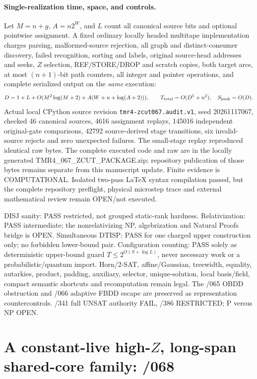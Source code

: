 \documentclass[11pt]{article}
\begin{document}
\paragraph{Single-realization time, space, and controls.}
Let $M=n+g$, $A=n2^W$, and $L$ count all canonical source bits
and optional pointwise assignment. A fixed ordinary locally headed
multitape implementation charges parsing, malformed-source rejection,
all graph and distinct-consumer discovery, failed recognition,
sorting and labels, original source-head addresses and seeks,
$Z$ selection, REF/STORE/DROP and scratch copies, both target arcs,
at most $(n+1)$-bit path counters, all integer and pointer operations,
and complete serialized output on the \emph{same} execution:
\[
 D=1+L+O(M^2\log(M+2)+A(W+n+\log(A+2))),\qquad
 T_{\rm total}=O(D^5+n^2),\quad S_{\rm peak}=O(D).
\]
Actual local CPython source revision \texttt{tmr4-zcut067.audit.v1},
seed 20261117067, checked 46 canonical sources, 4616 assignment
replays, 145016 independent original-gate comparisons, 42792
source-derived stage transitions, six invalid-source rejects and
zero unexpected failures. The small-stage replay reproduced identical
raw bytes. The complete executed code and raw are in the locally
generated TMR4\_067\_ZCUT\_PACKAGE.zip; repository publication of
those bytes remains separate from this manuscript update.
Finite evidence is COMPUTATIONAL. Isolated two-pass LaTeX
syntax compilation passed, but the complete repository preflight,
physical microstep trace and external mathematical review
remain OPEN/not executed.

DISJ sanity: PASS restricted, not grouped static-rank hardness.
Relativization: PASS intermediate; the nonrelativizing NP,
algebrization and Natural Proofs bridge is OPEN. Simultaneous
DTISP: PASS for one charged upper construction only; no forbidden
lower-bound pair. Configuration counting: PASS solely as
deterministic upper-bound guard $T\le2^{O(S+\log L)}$,
never necessary work or a probabilistic/quantum import.
Horn/2-SAT, affine/Gaussian, treewidth, equality, autarkies,
product, padding, auxiliary, selector, unique-solution, local
basis/field, compact semantic shortcuts and recomputation remain
legal. The /065 OBDD obstruction and /066 adaptive FBDD escape
are preserved as representation countercontrols. /341 full
UNSAT authority FAIL, /386 RESTRICTED; P versus NP OPEN.

\section{A constant-live high-$Z$, long-span shared-core family: /068}
\end{document}
